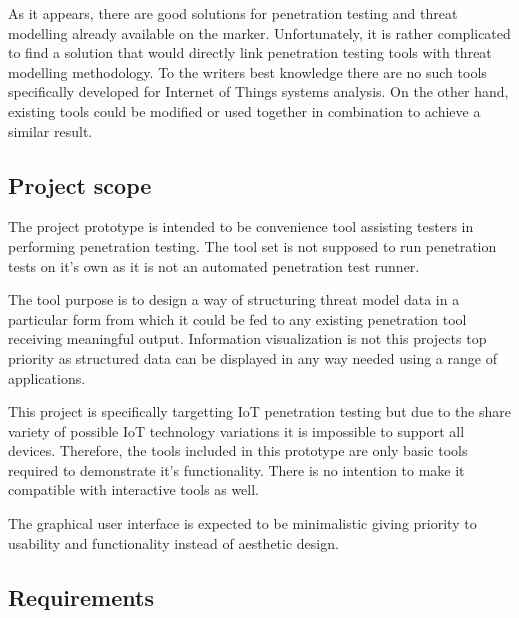	As it appears, there are good solutions for penetration testing and threat modelling already available on the marker. Unfortunately, it is rather complicated to find a solution that would directly link penetration testing tools with threat modelling methodology. To the writers best knowledge there are no such tools specifically developed for Internet of Things systems analysis. On the other hand, existing tools could be modified or used together in combination to achieve a similar result.


\subsection{Project scope}
	The project prototype is intended to be convenience tool assisting testers in performing penetration testing. The tool set is not supposed to run penetration tests on it's own as it is not an automated penetration test runner. 
	
	The tool purpose is to design a way of structuring threat model data in a particular form from which it could be fed to any existing penetration tool receiving meaningful output. Information visualization is not this projects top priority as structured data can be displayed in any way needed using a range of applications.
	
	This project is specifically targetting IoT penetration testing but due to the share variety of possible IoT technology variations it is impossible to support all devices. Therefore, the tools included in this prototype are only basic tools required to demonstrate it's functionality. There is no intention to make it compatible with interactive tools as well. 
	
	The graphical user interface is expected to be minimalistic giving priority to usability and functionality instead of aesthetic design.

\subsection{Requirements}
